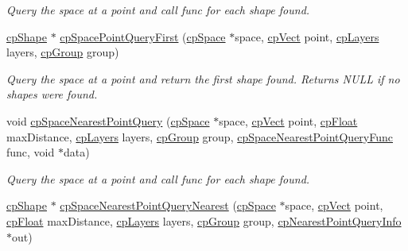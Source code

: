\begin{DoxyCompactItemize}
\begin{DoxyCompactList}\small\item\em Query the space at a point and call {\ttfamily func} for each shape found. \end{DoxyCompactList}\item 
\hypertarget{group__cp_space_gae6d8d0f438041fa2d3a8197c8b9d1962}{\hyperlink{structcp_shape}{cp\-Shape} $\ast$ \hyperlink{group__cp_space_gae6d8d0f438041fa2d3a8197c8b9d1962}{cp\-Space\-Point\-Query\-First} (\hyperlink{structcp_space}{cp\-Space} $\ast$space, \hyperlink{structcp_vect}{cp\-Vect} point, \hyperlink{group__basic_types_ga5ec31e87ed3973cab80f9bfbbbcb43bb}{cp\-Layers} layers, \hyperlink{group__basic_types_gacd811b1135a8f4a3e5cc019552b18b1a}{cp\-Group} group)}\label{group__cp_space_gae6d8d0f438041fa2d3a8197c8b9d1962}

\begin{DoxyCompactList}\small\item\em Query the space at a point and return the first shape found. Returns N\-U\-L\-L if no shapes were found. \end{DoxyCompactList}\item 
\hypertarget{group__cp_space_ga1d504acdaa0d9b4726e6c986e008c3f9}{void \hyperlink{group__cp_space_ga1d504acdaa0d9b4726e6c986e008c3f9}{cp\-Space\-Nearest\-Point\-Query} (\hyperlink{structcp_space}{cp\-Space} $\ast$space, \hyperlink{structcp_vect}{cp\-Vect} point, \hyperlink{group__basic_types_gac1ed65573e035bf892505768c852d8d3}{cp\-Float} max\-Distance, \hyperlink{group__basic_types_ga5ec31e87ed3973cab80f9bfbbbcb43bb}{cp\-Layers} layers, \hyperlink{group__basic_types_gacd811b1135a8f4a3e5cc019552b18b1a}{cp\-Group} group, \hyperlink{group__cp_space_gafcaf86d003ff9bc8ed04569ef07030cf}{cp\-Space\-Nearest\-Point\-Query\-Func} func, void $\ast$data)}\label{group__cp_space_ga1d504acdaa0d9b4726e6c986e008c3f9}

\begin{DoxyCompactList}\small\item\em Query the space at a point and call {\ttfamily func} for each shape found. \end{DoxyCompactList}\item 
\hypertarget{group__cp_space_ga59027791c8f5e0895d85fe45a64e2457}{\hyperlink{structcp_shape}{cp\-Shape} $\ast$ \hyperlink{group__cp_space_ga59027791c8f5e0895d85fe45a64e2457}{cp\-Space\-Nearest\-Point\-Query\-Nearest} (\hyperlink{structcp_space}{cp\-Space} $\ast$space, \hyperlink{structcp_vect}{cp\-Vect} point, \hyperlink{group__basic_types_gac1ed65573e035bf892505768c852d8d3}{cp\-Float} max\-Distance, \hyperlink{group__basic_types_ga5ec31e87ed3973cab80f9bfbbbcb43bb}{cp\-Layers} layers, \hyperlink{group__basic_types_gacd811b1135a8f4a3e5cc019552b18b1a}{cp\-Group} group, \hyperlink{structcp_nearest_point_query_info}{cp\-Nearest\-Point\-Query\-Info} $\ast$out)}\label{group__cp_space_ga59027791c8f5e0895d85fe45a64e2457}


\end{DoxyCompactItemize}
